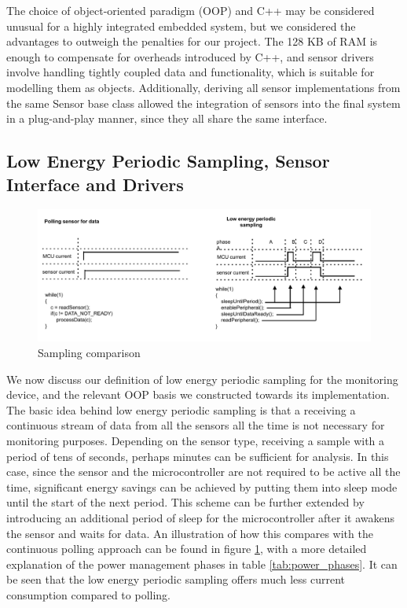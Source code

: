 The choice of object-oriented paradigm (OOP) and C++ may be considered unusual for a highly integrated embedded system, but we considered the advantages to outweigh the penalties for our project. The 128 KB of RAM is enough to compensate for overheads introduced by C++, and sensor drivers involve handling tightly coupled data and functionality, which is suitable for modelling them as objects. Additionally, deriving all sensor implementations from the same Sensor base class allowed the integration of sensors into the final system in a plug-and-play manner, since they all share the same interface.



\subsection{Low Energy Periodic Sampling, Sensor Interface and Drivers}
\begin{figure}
\centering
\includegraphics[width=\textwidth]{Images/sampling_comparison}
\caption{Sampling comparison}
\label{fig:sampling_comparison}
\end{figure}
We now discuss our definition of low energy periodic sampling for the monitoring device, and the relevant OOP basis we constructed towards its implementation. The basic idea behind low energy periodic sampling is that a receiving a continuous stream of data from all the sensors all the time is not necessary for monitoring purposes. Depending on the sensor type, receiving a sample with a period of tens of seconds, perhaps minutes can be sufficient for analysis. In this case, since the sensor and the microcontroller are not required to be active all the time, significant energy savings can be achieved by putting them into sleep mode until the start of the next period. This scheme can be further extended by introducing an additional period of sleep for the microcontroller after it awakens the sensor and waits for data. An illustration of how this compares with the continuous polling approach can be found in figure \ref{fig:sampling_comparison}, with a more detailed explanation of the power management phases in table \ref{tab:power_phases}. It can be seen that the low energy periodic sampling offers much less current consumption compared to polling.

